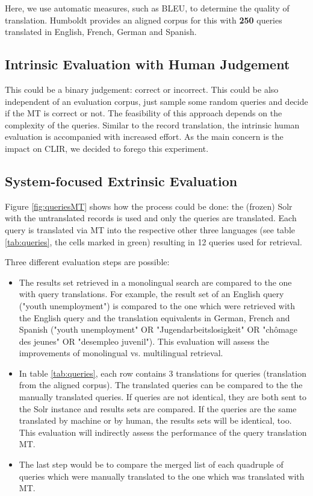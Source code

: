 \documentclass[a4paper,11pt]{article}
\begin{document}
Here, we use automatic measures, such as BLEU, to determine the quality of translation. Humboldt provides an aligned corpus for this with \textbf{250} queries translated in  English, French, German and Spanish. 

\subsection{Intrinsic Evaluation with Human Judgement}
This could be a binary judgement: correct or incorrect.
This could be also independent of an evaluation corpus, just sample some random queries and decide if the MT is correct or not. The feasibility of this approach depends on the complexity of the queries. Similar to the record translation, the intrinsic human evaluation is accompanied with increased effort. As the main concern is the impact on CLIR, we decided to forego this experiment. 

\subsection{System-focused Extrinsic Evaluation}
Figure \ref{fig:queriesMT} shows how the process could be done: the (frozen) Solr with the untranslated records is used and only the queries are translated. Each query is translated via MT into the respective other three languages (see table \ref{tab:queries}, the cells marked in green) resulting in 12 queries used for retrieval.

Three different evaluation steps are possible: 
\begin{itemize}
\item The results set retrieved in a monolingual search are compared to the one with query translations. For example, the result set of an English query ("youth unemployment") is compared to the one which were retrieved with the English query and the translation equivalents in German, French and Spanish ("youth unemployment" OR "Jugendarbeitslosigkeit" OR "chômage des jeunes" OR "desempleo juvenil"). This evaluation will assess the improvements of monolingual vs. multilingual  retrieval.
\item In table \ref{tab:queries}, each row contains 3 translations for queries (translation from the aligned corpus). The translated queries can be compared to the the manually translated queries. If queries are not identical, they are both sent to the Solr instance and results sets are compared. If the queries are the same translated by machine or by human, the results sets will be identical, too. This evaluation will indirectly assess the performance of the query translation MT. 
\item The last step would be to compare the merged list of each quadruple of queries which were manually translated to the one which was translated with MT.
\end{itemize}
 
\end{document}
